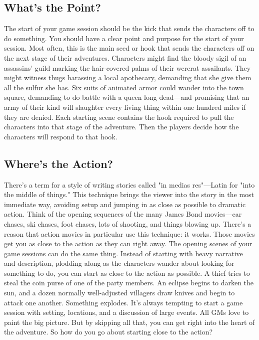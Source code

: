 \documentclass[10pt,a4paper,twoside,bg=print,twocolumn,openany,nodeprecatedcode]{dndbook}
\begin{document}
\subsection{What's the Point?}
The start of your game session should be the kick that sends the characters off to do something. You should have a clear point and purpose for the start of your session. Most often, this is the main seed or hook that sends the characters off on the next stage of their adventures.
Characters might find the bloody sigil of an assassins' guild marking the hair-covered palms of their wererat assailants. They might witness thugs harassing a local apothecary, demanding that she give them all the sulfur she has. Six suits of animated armor could wander into the town square, demanding to do battle with a queen long dead—and promising that an army of their kind will slaughter every living thing within one hundred miles if they are denied. Each starting scene contains the hook required to pull the characters into that stage of the adventure. Then the players decide how the characters will respond to that hook.
\subsection{Where's the Action?}
There's a term for a style of writing stories called "in medias res"—Latin for "into the middle of things." This technique brings the viewer into the story in the most immediate way, avoiding setup and jumping in as close as possible to dramatic action. Think of the opening sequences of the many James Bond movies—car chases, ski chases, foot chases, lots of shooting, and things blowing up.
There's a reason that action movies in particular use this technique: it works. Those movies get you as close to the action as they can right away.
The opening scenes of your game sessions can do the same thing. Instead of starting with heavy narrative and description, plodding along as the characters wander about looking for something to do, you can start as close to the action as possible. A thief tries to steal the coin purse of one of the party members. An eclipse begins to darken the sun, and a dozen normally well-adjusted villagers draw knives and begin to attack one another. Something explodes.
It's always tempting to start a game session with setting, locations, and a discussion of large events. All GMs love to paint the big picture. But by skipping all that, you can get right into the heart of the adventure. So how do you go about starting close to the action?
\end{document}

